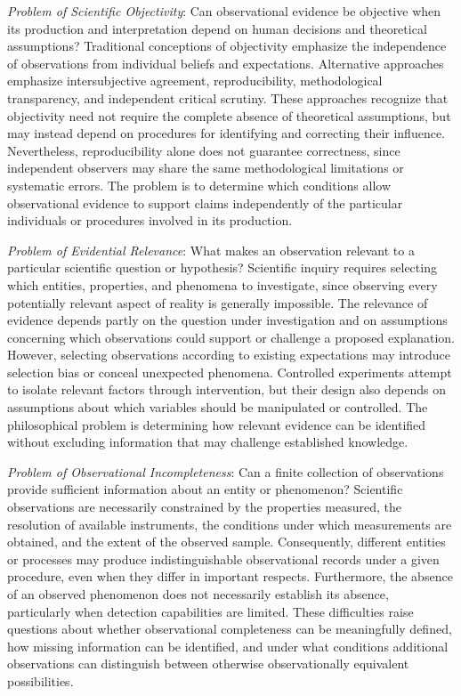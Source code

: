 \emph{Problem of Scientific Objectivity}: Can observational evidence be objective when its production and interpretation depend on human decisions and theoretical assumptions? Traditional conceptions of objectivity emphasize the independence of observations from individual beliefs and expectations. Alternative approaches emphasize intersubjective agreement, reproducibility, methodological transparency, and independent critical scrutiny. These approaches recognize that objectivity need not require the complete absence of theoretical assumptions, but may instead depend on procedures for identifying and correcting their influence. Nevertheless, reproducibility alone does not guarantee correctness, since independent observers may share the same methodological limitations or systematic errors. The problem is to determine which conditions allow observational evidence to support claims independently of the particular individuals or procedures involved in its production.

\emph{Problem of Evidential Relevance}: What makes an observation relevant to a particular scientific question or hypothesis? Scientific inquiry requires selecting which entities, properties, and phenomena to investigate, since observing every potentially relevant aspect of reality is generally impossible. The relevance of evidence depends partly on the question under investigation and on assumptions concerning which observations could support or challenge a proposed explanation. However, selecting observations according to existing expectations may introduce selection bias or conceal unexpected phenomena. Controlled experiments attempt to isolate relevant factors through intervention, but their design also depends on assumptions about which variables should be manipulated or controlled. The philosophical problem is determining how relevant evidence can be identified without excluding information that may challenge established knowledge.

\emph{Problem of Observational Incompleteness}: Can a finite collection of observations provide sufficient information about an entity or phenomenon? Scientific observations are necessarily constrained by the properties measured, the resolution of available instruments, the conditions under which measurements are obtained, and the extent of the observed sample. Consequently, different entities or processes may produce indistinguishable observational records under a given procedure, even when they differ in important respects. Furthermore, the absence of an observed phenomenon does not necessarily establish its absence, particularly when detection capabilities are limited. These difficulties raise questions about whether observational completeness can be meaningfully defined, how missing information can be identified, and under what conditions additional observations can distinguish between otherwise observationally equivalent possibilities.

